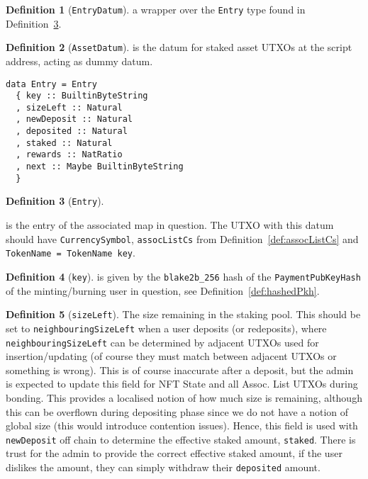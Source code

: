 \documentclass[10pt, a4paper]{article}
\theoremstyle{definition}
\newtheorem{definition}{Definition}[section]
\begin{document}
\begin{definition}[\texttt{EntryDatum}]\label{def:EntryDatum} a wrapper over the \texttt{Entry} type found in Definition~\ref{def:Entry}.
\end{definition}

\begin{definition}[\texttt{AssetDatum}]\label{def:AssetDatum} is the datum for staked asset UTXOs at the script address, acting as dummy datum.
\end{definition}

\begin{verbatim}
data Entry = Entry
  { key :: BuiltinByteString
  , sizeLeft :: Natural
  , newDeposit :: Natural
  , deposited :: Natural
  , staked :: Natural
  , rewards :: NatRatio
  , next :: Maybe BuiltinByteString
  }
\end{verbatim}
\begin{definition}[\texttt{Entry}]\label{def:Entry}
\end{definition} is the entry of the associated map in question. The UTXO with this datum should have \texttt{CurrencySymbol},  \texttt{assocListCs} from Definition~\ref{def:assocListCs} and \texttt{TokenName = TokenName key}.

\begin{definition}[\texttt{key}]\label{def:key}
is given by the \texttt{blake2b\_256} hash of the \texttt{PaymentPubKeyHash} of the minting/burning user in question, see Definition~\ref{def:hashedPkh}. 
\end{definition}

\begin{definition}[\texttt{sizeLeft}]\label{def:sizeLeft}
The size remaining in the staking pool. This should be set to \texttt{neighbouringSizeLeft} when a user deposits (or redeposits), where \texttt{neighbouringSizeLeft} can be determined by adjacent UTXOs used for insertion/updating (of course they must match between adjacent UTXOs or something is wrong). This is of course inaccurate after a deposit, but the admin is expected to update this field for NFT State and all Assoc. List UTXOs during bonding.  This provides a localised notion of how much size is remaining, although this can be overflown during depositing phase since we do not have a notion of global size (this would introduce contention issues). Hence, this field is used with \texttt{newDeposit} off chain to determine the effective staked amount, \texttt{staked}. There is trust for the admin to provide the correct effective staked amount, if the user dislikes the amount, they can simply withdraw their \texttt{deposited} amount.
\end{definition}
\end{document}
